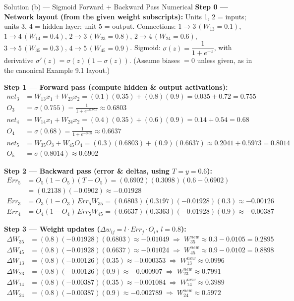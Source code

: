 \documentclass[12pt,a4paper]{article}
\begin{document}
\begin{solbox}{Solution (b) --- Sigmoid Forward + Backward Pass Numerical}
\textbf{Step 0 --- Network layout (from the given weight subscripts):}
Units 1, 2 = inputs; units 3, 4 = hidden layer; unit 5 = output.
Connections: $1{\to}3\,(W_{13}{=}0.1)$, $1{\to}4\,(W_{14}{=}0.4)$, $2{\to}3\,(W_{23}{=}0.8)$, $2{\to}4\,(W_{24}{=}0.6)$, $3{\to}5\,(W_{35}{=}0.3)$, $4{\to}5\,(W_{45}{=}0.9)$. Sigmoid: $\sigma(z) = \dfrac{1}{1+e^{-z}}$, with derivative $\sigma'(z)=\sigma(z)(1-\sigma(z))$. (Assume biases $=0$ unless given, as in the canonical Example 9.1 layout.)

\textbf{Step 1 --- Forward pass (compute hidden \& output activations):}
\begin{align*}
net_3 &= W_{13}x_1 + W_{23}x_2 = (0.1)(0.35)+(0.8)(0.9) = 0.035+0.72 = 0.755 \\
O_3 &= \sigma(0.755) = \frac{1}{1+e^{-0.755}} \approx 0.6803 \\
net_4 &= W_{14}x_1 + W_{24}x_2 = (0.4)(0.35)+(0.6)(0.9) = 0.14+0.54 = 0.68 \\
O_4 &= \sigma(0.68) = \frac{1}{1+e^{-0.68}} \approx 0.6637 \\
net_5 &= W_{35}O_3 + W_{45}O_4 = (0.3)(0.6803)+(0.9)(0.6637) \approx 0.2041+0.5973 = 0.8014 \\
O_5 &= \sigma(0.8014) \approx 0.6902
\end{align*}

\textbf{Step 2 --- Backward pass (error \& deltas, using $T=y=0.6$):}
\begin{align*}
Err_5 &= O_5(1-O_5)(T - O_5) = (0.6902)(0.3098)(0.6 - 0.6902) \\
      &= (0.2138)(-0.0902) \approx -0.01928 \\
Err_3 &= O_3(1-O_3)\,Err_5 W_{35} = (0.6803)(0.3197)(-0.01928)(0.3) \approx -0.00126 \\
Err_4 &= O_4(1-O_4)\,Err_5 W_{45} = (0.6637)(0.3363)(-0.01928)(0.9) \approx -0.00387
\end{align*}

\textbf{Step 3 --- Weight updates ($\Delta w_{ij} = l \cdot Err_j \cdot O_i$, $l=0.8$):}
\begin{align*}
\Delta W_{35} &= (0.8)(-0.01928)(0.6803) \approx -0.01049 \;\Rightarrow\; W_{35}^{new} \approx 0.3 - 0.0105 = 0.2895\\
\Delta W_{45} &= (0.8)(-0.01928)(0.6637) \approx -0.01024 \;\Rightarrow\; W_{45}^{new} \approx 0.9 - 0.0102 = 0.8898\\
\Delta W_{13} &= (0.8)(-0.00126)(0.35) \approx -0.000353 \;\Rightarrow\; W_{13}^{new} \approx 0.0996\\
\Delta W_{23} &= (0.8)(-0.00126)(0.9) \approx -0.000907 \;\Rightarrow\; W_{23}^{new} \approx 0.7991\\
\Delta W_{14} &= (0.8)(-0.00387)(0.35) \approx -0.001084 \;\Rightarrow\; W_{14}^{new} \approx 0.3989\\
\Delta W_{24} &= (0.8)(-0.00387)(0.9) \approx -0.002789 \;\Rightarrow\; W_{24}^{new} \approx 0.5972
\end{align*}


\end{solbox}
\end{document}
